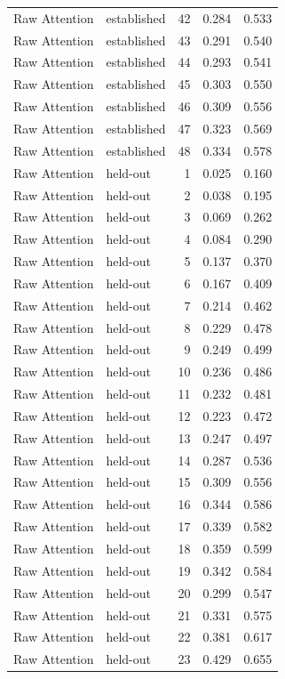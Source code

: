 \begin{tabular}{llrrr}
Raw Attention & established & 42 & 0.284 & 0.533 \\
Raw Attention & established & 43 & 0.291 & 0.540 \\
Raw Attention & established & 44 & 0.293 & 0.541 \\
Raw Attention & established & 45 & 0.303 & 0.550 \\
Raw Attention & established & 46 & 0.309 & 0.556 \\
Raw Attention & established & 47 & 0.323 & 0.569 \\
Raw Attention & established & 48 & 0.334 & 0.578 \\
Raw Attention & held-out & 1 & 0.025 & 0.160 \\
Raw Attention & held-out & 2 & 0.038 & 0.195 \\
Raw Attention & held-out & 3 & 0.069 & 0.262 \\
Raw Attention & held-out & 4 & 0.084 & 0.290 \\
Raw Attention & held-out & 5 & 0.137 & 0.370 \\
Raw Attention & held-out & 6 & 0.167 & 0.409 \\
Raw Attention & held-out & 7 & 0.214 & 0.462 \\
Raw Attention & held-out & 8 & 0.229 & 0.478 \\
Raw Attention & held-out & 9 & 0.249 & 0.499 \\
Raw Attention & held-out & 10 & 0.236 & 0.486 \\
Raw Attention & held-out & 11 & 0.232 & 0.481 \\
Raw Attention & held-out & 12 & 0.223 & 0.472 \\
Raw Attention & held-out & 13 & 0.247 & 0.497 \\
Raw Attention & held-out & 14 & 0.287 & 0.536 \\
Raw Attention & held-out & 15 & 0.309 & 0.556 \\
Raw Attention & held-out & 16 & 0.344 & 0.586 \\
Raw Attention & held-out & 17 & 0.339 & 0.582 \\
Raw Attention & held-out & 18 & 0.359 & 0.599 \\
Raw Attention & held-out & 19 & 0.342 & 0.584 \\
Raw Attention & held-out & 20 & 0.299 & 0.547 \\
Raw Attention & held-out & 21 & 0.331 & 0.575 \\
Raw Attention & held-out & 22 & 0.381 & 0.617 \\
Raw Attention & held-out & 23 & 0.429 & 0.655 \\

\end{tabular}
